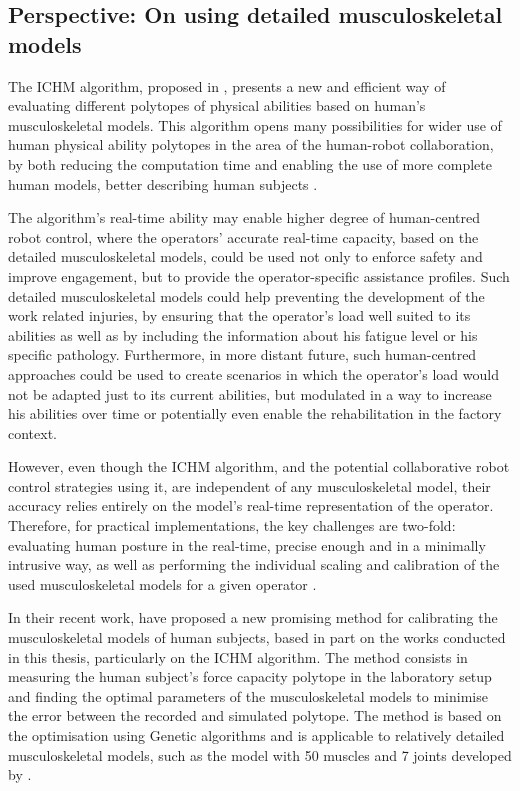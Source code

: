 \subsection{Perspective: On using detailed musculoskeletal models}
\label{sec:human_robot_prospective}

The ICHM algorithm, proposed in , presents a new and efficient way of evaluating different polytopes of physical abilities based on human's musculoskeletal models. This algorithm opens many possibilities for wider use of human physical ability polytopes in the area of the human-robot collaboration, by both reducing the computation time and enabling the use of more complete human models, better describing human subjects \cite{sohn2019effects}. 

The algorithm's real-time ability may enable higher degree of human-centred robot control, where the operators' accurate real-time capacity, based on the detailed musculoskeletal models, could be used not only to enforce safety and improve engagement, but to provide the operator-specific assistance profiles. Such detailed musculoskeletal models could help preventing the development of the work related injuries, by ensuring that the operator's load well suited to its abilities as well as by including the information about his fatigue level \cite{Bolghanabadi2014fatigue} or his specific pathology. Furthermore, in more distant future, such human-centred approaches could be used to create scenarios in which the operator's load would not be adapted just to its current abilities, but modulated in a way to increase his abilities over time or potentially even enable the rehabilitation in the factory context. 

However, even though the ICHM algorithm, and the potential collaborative robot control strategies using it, are independent of any musculoskeletal model, their accuracy relies entirely on the model's real-time representation of the operator. Therefore, for practical implementations, the key challenges are two-fold: evaluating human posture in the real-time, precise enough and in a minimally intrusive way, as well as performing the individual scaling and calibration of the used musculoskeletal models for a given operator \cite{correa20112782}.

In their recent work, \citet{laisne2023Genetic} have proposed a new promising method for calibrating the musculoskeletal models of human subjects, based in part on the works conducted in this thesis, particularly on the ICHM algorithm. The method consists in measuring the human subject's force capacity polytope in the laboratory setup and finding the optimal parameters of the musculoskeletal models to minimise the error between the recorded and simulated polytope. The method is based on the optimisation using Genetic algorithms and is applicable to relatively detailed musculoskeletal models, such as the model with 50 muscles and 7 joints developed by \citet{holzbaur2005model}.

